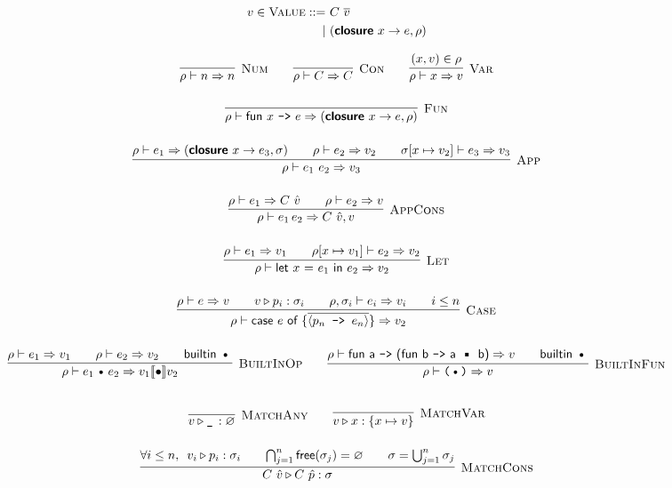 \documentclass{article}
\def\code#1{\textsf{#1}}
\def\por{\ | \ }
\def\rt{\Rightarrow}
\def\binop{\, \text{\textbullet}\, }
\def\envj#1#2#3{#1 \vdash #2 \rt #3}
\def\closure#1#2#3{(\textsf{\textbf{closure}} \ #1 \to #2,#3)}
\def\tsc#1{\textsc{#1}}
\def\matchj#1#2#3{#1 \triangleright #2 : #3}
\begin{document}
\begin{align*}
v\in \textsc{Value}::=\ & C \ \overline{v} \\
\por & \closure x e \rho
\end{align*}
\pagebreak

\begin{gather*}
\infer[\tsc{Num}]{\envj \rho n n}{}\qquad
\infer[\tsc{Con}]{\envj \rho C C}{}\qquad
\infer[\tsc{Var}]{\envj \rho x v}{(x,v)\in \rho}\\[12pt]
\infer[\tsc{Fun}]{\envj \rho {\code{fun $x$ \texttt{->} $e$}} {\closure x e \rho}}{}\\[12pt]
\infer[\tsc{App}]{\envj \rho {e_1 \ e_2} v_3}{\envj{\rho}{e_1}{\closure x {e_3} {\sigma}} && \envj \rho {e_2} {v_2} && \envj{\sigma [x\mapsto v_2]}{e_3}{v_3}}\\[12pt]
\infer[\tsc{AppCons}]{\envj{\rho}{e_1\, e_2}{C\ \hat{v},v}}{\envj{\rho}{e_1}{C\ \hat{v}} && \envj{\rho}{e_2}{v}}\\[12pt]
\infer[\tsc{Let}]{\envj \rho {\code{let $x$ = $e_1$ in $e_2$}} {v_2}}{\envj \rho {e_1} {v_1} && \envj {\rho[x\mapsto v_1]} {e_2} {v_2}}\\[12pt]
\infer[\tsc{Case}]{\envj \rho {\code{case $e$ of \{$\overline{\langle p_n \texttt{ -> } e_n\rangle}$\}}} {v_2}}{\envj \rho {e} {v} && v\triangleright p_i : \sigma_i && \envj {\rho,\sigma_i}{e_i}{v_i} && i \leq n}\\[12pt]
\infer[\tsc{BuiltInOp}]{\envj \rho {e_1 \binop e_2} {v_1\llbracket\bullet \rrbracket v_2}}{\envj \rho {e_1} {v_1} && \envj {\rho} {e_2} {v_2} && \textsf{builtin}\, \binop}\qquad
\infer[\tsc{BuiltInFun}]{\envj \rho {\texttt{($\binop$)}} {v}}{\envj \rho {\code{fun a \texttt{->} (fun b \texttt{->} a $\binop$ b)}} {v} && \textsf{builtin}\, \binop}\\[12pt]
\end{gather*}

\begin{gather*}
\infer[\tsc{MatchAny}]{\matchj v {\texttt{\_}\,} \varnothing}{}\qquad
\infer[\tsc{MatchVar}]{\matchj v x {\{x\mapsto v\}}}{}\\[12pt]
\infer[\tsc{MatchCons}]{\matchj {C\ \hat{v}} {C\ \hat{p}} \sigma}{\forall i \leq n,\ \, \matchj{v_i}{p_i}{\sigma_i} && \bigcap_{j=1}^n \textsf{free}(\sigma_j)=\varnothing && \sigma = \bigcup_{j=1}^n \sigma_j}	
\end{gather*}
\end{document}
